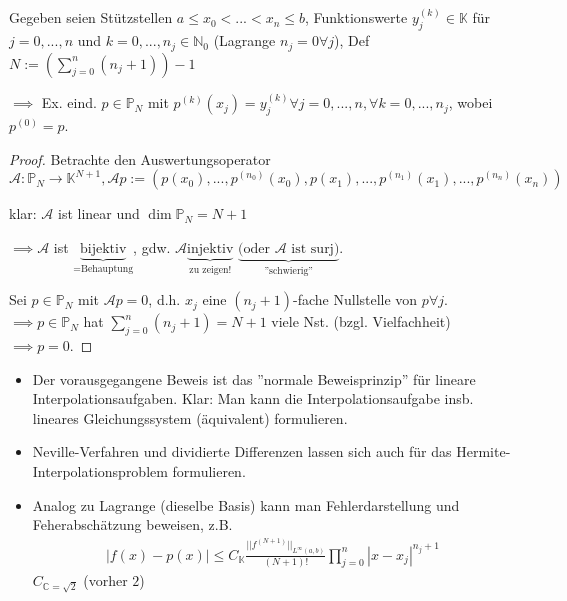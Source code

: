\begin{theorem}[Wohlgestelltheit]
	Gegeben seien Stützstellen $a \leq x_0 < ... < x_n \leq b$, Funktionswerte $y_j^(k) \in \mathbb{K}$ für $j=0, ..., n$ und $k=0, ..., n_j \in \mathbb{N}_0$ (Lagrange $n_j = 0 \forall j$), Def $N := \left(\sum_{j=0}^{n}(n_j + 1)\right)-1$
	
	$\implies$ Ex. eind. $p \in \mathbb{P}_N$ mit $p^{(k)}(x_j) = y_j^{(k)} \forall j=0, ..., n, \forall k=0, ..., n_j$, wobei $p^{(0)} = p$.
\end{theorem}

\begin{proof}
	Betrachte den Auswertungsoperator $\mathcal{A}: \mathbb{P}_N \rightarrow \mathbb{K}^{N+1}, \mathcal{A}p := (p(x_0), ..., p^{(n_0)}(x_0), p(x_1), ..., p^{(n_1)}(x_1), ..., p^{(n_n)}(x_n))$
	
	klar: $\mathcal{A}$ ist linear und $\dim \mathbb{P}_N = N+1$
	
	$\implies \mathcal{A}$ ist $\underbrace{\text{bijektiv}}_{\text{=Behauptung}}$, gdw. $\mathcal{A} \underbrace{\text{injektiv}}_{\text{zu zeigen!}}$ $\underbrace{\text{(oder $\mathcal{A}$ ist surj)}}_{\text{''schwierig''}}$.
	
	Sei $p \in \mathbb{P}_N$ mit $\mathcal{A}p = 0$, d.h. $x_j$ eine $(n_j+1)$-fache Nullstelle von $p \forall j$. $\implies p \in \mathbb{P}_N$ hat $\sum_{j=0}^{n}(n_j+1) = N+1$ viele Nst. (bzgl. Vielfachheit) $\implies p = 0$. 
\end{proof}

\begin{remark}
	\begin{itemize}
		\item Der vorausgegangene Beweis ist das ''normale Beweisprinzip'' für lineare Interpolationsaufgaben. Klar: Man kann die Interpolationsaufgabe insb. lineares Gleichungssystem (äquivalent) formulieren.
		\item Neville-Verfahren und dividierte Differenzen lassen sich auch für das Hermite-Interpolationsproblem formulieren.
		\item Analog zu Lagrange (dieselbe Basis) kann man Fehlerdarstellung und Feherabschätzung beweisen, z.B.
		\begin{align*}
			|f(x)-p(x)| \leq C_{\mathbb{K}} \frac{||f^{(N+1)}||_{L^\infty(a,b)}}{(N+1)!} \prod_{j=0}^{n} |x-x_j|^{n_j+1}
		\end{align*}
		$C_{\mathbb{C} = \sqrt{2}}$ (vorher $2$)
	\end{itemize}
\end{remark}

